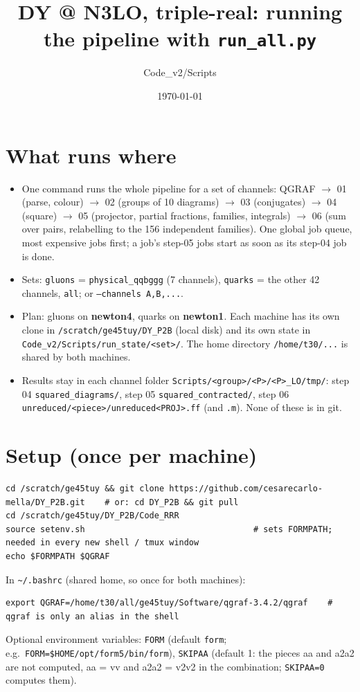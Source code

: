 \documentclass[10pt]{article}
\title{DY @ N3LO, triple-real: running the pipeline with \texttt{run\_all.py}}
\author{Code\_v2/Scripts}
\date{\today}
\newcommand{\cmd}[1]{\texttt{#1}}
\begin{document}
\maketitle
\tableofcontents

\section{What runs where}
\begin{itemize}
\item One command runs the whole pipeline for a set of channels: QGRAF $\to$ 01 (parse, colour) $\to$ 02 (groups of
  10 diagrams) $\to$ 03 (conjugates) $\to$ 04 (square) $\to$ 05 (projector, partial fractions, families, integrals)
  $\to$ 06 (sum over pairs, relabelling to the 156 independent families). One global job queue, most expensive jobs
  first; a job's step-05 jobs start as soon as its step-04 job is done.
\item Sets: \cmd{gluons} = \cmd{physical\_qqbggg} (7 channels), \cmd{quarks} = the other 42 channels, \cmd{all};
  or \cmd{--channels A,B,...}.
\item Plan: gluons on \textbf{newton4}, quarks on \textbf{newton1}. Each machine has its own clone in
  \cmd{/scratch/ge45tuy/DY\_P2B} (local disk) and its own state in \cmd{Code\_v2/Scripts/run\_state/<set>/}.
  The home directory \cmd{/home/t30/...} is shared by both machines.
\item Results stay in each channel folder \cmd{Scripts/<group>/<P>/<P>\_LO/tmp/}: step 04
  \cmd{squared\_diagrams/}, step 05 \cmd{squared\_contracted/}, step 06 \cmd{unreduced/<piece>/unreduced<PROJ>.ff}
  (and \cmd{.m}). None of these is in git.
\end{itemize}

\section{Setup (once per machine)}
\begin{lstlisting}
cd /scratch/ge45tuy && git clone https://github.com/cesarecarlo-mella/DY_P2B.git    # or: cd DY_P2B && git pull
cd /scratch/ge45tuy/DY_P2B/Code_RRR
source setenv.sh                                  # sets FORMPATH; needed in every new shell / tmux window
echo $FORMPATH $QGRAF
\end{lstlisting}
In \cmd{\textasciitilde/.bashrc} (shared home, so once for both machines):
\begin{lstlisting}
export QGRAF=/home/t30/all/ge45tuy/Software/qgraf-3.4.2/qgraf    # qgraf is only an alias in the shell
\end{lstlisting}
Optional environment variables: \cmd{FORM} (default \cmd{form}; e.g.\ \cmd{FORM=\$HOME/opt/form5/bin/form}),
\cmd{SKIPAA} (default 1: the pieces aa and a2a2 are not computed, aa = vv and a2a2 = v2v2 in the combination;
\cmd{SKIPAA=0} computes them).
\end{document}
